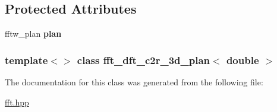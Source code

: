 \subsection*{Protected Attributes}
\begin{DoxyCompactItemize}
\item 
\hypertarget{classfft__dft__c2r__3d__plan_3_01double_01_4_ae019df4218f3519eea8e177592f81ad9}{
fftw\_\-plan {\bfseries plan}}
\label{classfft__dft__c2r__3d__plan_3_01double_01_4_ae019df4218f3519eea8e177592f81ad9}

\end{DoxyCompactItemize}
\subsubsection*{template$<$$>$ class fft\_\-dft\_\-c2r\_\-3d\_\-plan$<$ double $>$}



The documentation for this class was generated from the following file:\begin{DoxyCompactItemize}
\item 
\hyperlink{fft_8hpp}{fft.hpp}\end{DoxyCompactItemize}
